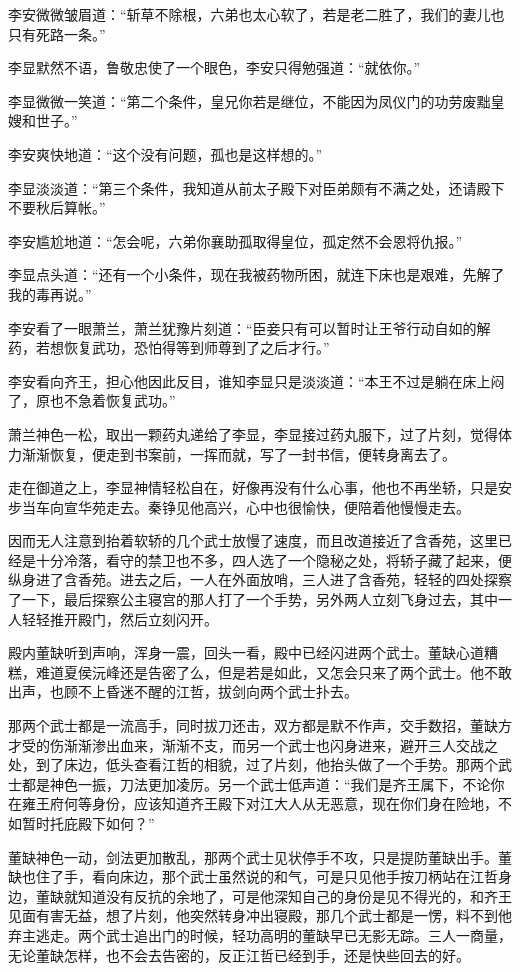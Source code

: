 李安微微皱眉道：“斩草不除根，六弟也太心软了，若是老二胜了，我们的妻儿也只有死路一条。”

李显默然不语，鲁敬忠使了一个眼色，李安只得勉强道：“就依你。”

李显微微一笑道：“第二个条件，皇兄你若是继位，不能因为凤仪门的功劳废黜皇嫂和世子。”

李安爽快地道：“这个没有问题，孤也是这样想的。”

李显淡淡道：“第三个条件，我知道从前太子殿下对臣弟颇有不满之处，还请殿下不要秋后算帐。”

李安尴尬地道：“怎会呢，六弟你襄助孤取得皇位，孤定然不会恩将仇报。”

李显点头道：“还有一个小条件，现在我被药物所困，就连下床也是艰难，先解了我的毒再说。”

李安看了一眼萧兰，萧兰犹豫片刻道：“臣妾只有可以暂时让王爷行动自如的解药，若想恢复武功，恐怕得等到师尊到了之后才行。”

李安看向齐王，担心他因此反目，谁知李显只是淡淡道：“本王不过是躺在床上闷了，原也不急着恢复武功。”

萧兰神色一松，取出一颗药丸递给了李显，李显接过药丸服下，过了片刻，觉得体力渐渐恢复，便走到书案前，一挥而就，写了一封书信，便转身离去了。

走在御道之上，李显神情轻松自在，好像再没有什么心事，他也不再坐轿，只是安步当车向宣华苑走去。秦铮见他高兴，心中也很愉快，便陪着他慢慢走去。

因而无人注意到抬着软轿的几个武士放慢了速度，而且改道接近了含香苑，这里已经是十分冷落，看守的禁卫也不多，四人选了一个隐秘之处，将轿子藏了起来，便纵身进了含香苑。进去之后，一人在外面放哨，三人进了含香苑，轻轻的四处探察了一下，最后探察公主寝宫的那人打了一个手势，另外两人立刻飞身过去，其中一人轻轻推开殿门，然后立刻闪开。

殿内董缺听到声响，浑身一震，回头一看，殿中已经闪进两个武士。董缺心道糟糕，难道夏侯沅峰还是告密了么，但是若是如此，又怎会只来了两个武士。他不敢出声，也顾不上昏迷不醒的江哲，拔剑向两个武士扑去。

那两个武士都是一流高手，同时拔刀还击，双方都是默不作声，交手数招，董缺方才受的伤渐渐渗出血来，渐渐不支，而另一个武士也闪身进来，避开三人交战之处，到了床边，低头查看江哲的相貌，过了片刻，他抬头做了一个手势。那两个武士都是神色一振，刀法更加凌厉。另一个武士低声道：“我们是齐王属下，不论你在雍王府何等身份，应该知道齐王殿下对江大人从无恶意，现在你们身在险地，不如暂时托庇殿下如何？”

董缺神色一动，剑法更加散乱，那两个武士见状停手不攻，只是提防董缺出手。董缺也住了手，看向床边，那个武士虽然说的和气，可是只见他手按刀柄站在江哲身边，董缺就知道没有反抗的余地了，可是他深知自己的身份是见不得光的，和齐王见面有害无益，想了片刻，他突然转身冲出寝殿，那几个武士都是一愣，料不到他弃主逃走。两个武士追出门的时候，轻功高明的董缺早已无影无踪。三人一商量，无论董缺怎样，也不会去告密的，反正江哲已经到手，还是快些回去的好。


